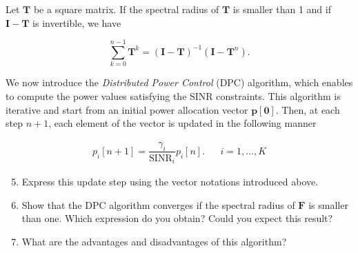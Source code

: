 \documentclass [a4paper, 11pt] {article}
\begin{document}
\begin{exercise}{2}
Let $\mathbf{T}$ be a square matrix. If the spectral radius of $\mathbf{T}$ is smaller than 1 and if $\mathbf{I} - \mathbf{T}$ is invertible, we have

\begin{equation} \sum_{k=0}^{n-1} \mathbf{T}^k = (\mathbf{I} - \mathbf{T})^{-1}(\mathbf{I} - \mathbf{T}^n). \end{equation}


We now introduce the \textit{Distributed Power Control} (DPC) algorithm, which enables to compute the power values satisfying the SINR constraints. This algorithm is iterative and start from an initial power allocation vector $\mathbf{p[0]}$. Then, at each step $n+1$, each element of the vector is updated in the following manner

\begin{align}
    p_i[n+1] = \dfrac{\gamma_i}{\text{SINR}_i}p_i[n]. && i=1,\hdots,K
\end{align}


\begin{enumerate}
\setcounter{enumi}{4}
\item Express this update step using the vector notations introduced above.
\item Show that the DPC algorithm converges if the spectral radius of $\mathbf{F}$ is smaller than one. Which expression do you obtain? Could you expect this result?
\end{enumerate}

\begin{enumerate}
\setcounter{enumi}{6}
\item What are the advantages and disadvantages of this algorithm?
\end{enumerate}

    \end{exercise}
\end{document}
